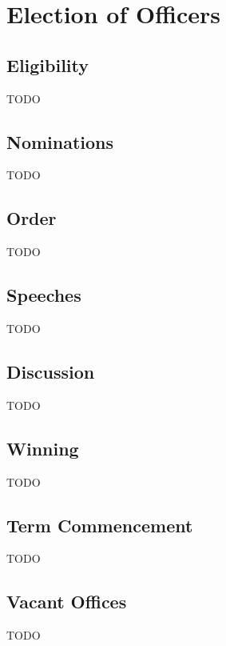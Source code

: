 \chapter{Election of Officers}

\section{Eligibility}\label{sec:eligibility}
TODO

\section{Nominations}\label{sec:nominations}
TODO

\section{Order}\label{sec:order}
TODO

\section{Speeches}\label{sec:speeches}
TODO

\section{Discussion}\label{sec:discussion}
TODO

\section{Winning}\label{sec:winning}
TODO

\section{Term Commencement}\label{sec:term_commencement}
TODO

\section{Vacant Offices}\label{sec:vacant_offices}
TODO
